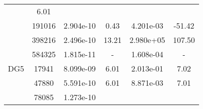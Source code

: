 \begin{table}
\begin{center}
{\begin{tabular}{| l | c | c | c | c | c |}
                &6.01\\
                
            &191016
            
                &2.904e-10
                
                &0.43
                
                &4.201e-03
                
                &-51.42\\
                
            &398216
            
                &2.496e-10
                
                &13.21
                
                &2.980e+05
                
                &107.50\\
                
            &584325
            
                &1.815e-11
                
                &-
                
                &1.608e-04
                
                &-\\
                \hline
        \hline
        \hspace{0.1cm}DG5\hspace{0.1cm}    
        
            &17941
            
                &8.099e-09
                
                &6.01
                
                &2.013e-01
                
                &7.02\\
                
            &47880
            
                &5.591e-10
                
                &6.01
                
                &8.871e-03
                
                &7.01\\
                
            &78085
            
                &1.273e-10
                

\end{tabular}}
\end{center}
\end{table}

